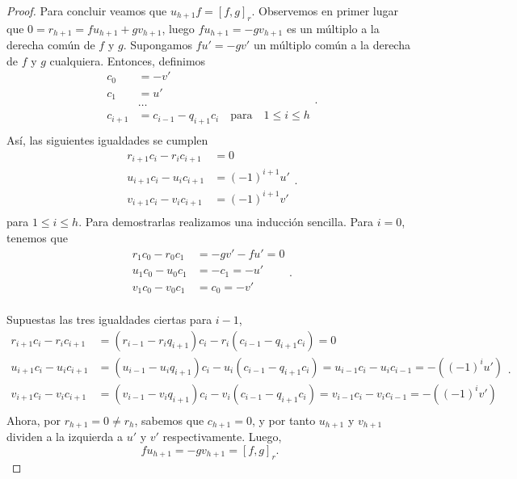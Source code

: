 \begin{proof}
Para concluir veamos que \(u_{h+1}f = [f,g]_r\). Observemos en primer lugar que \(0 = r_{h+1} = fu_{h+1} + gv_{h+1}\), luego \(fu_{h+1} = -gv_{h+1}\) es un múltiplo a la derecha común de \(f\) y \(g\). Supongamos \(fu' = -gv'\) un múltiplo común a la derecha de \(f\) y \(g\) cualquiera. Entonces, definimos
\[
\begin{aligned}
    c_0 &= -v' \\
    c_1 &= u' \\
    &\ldots \\
    c_{i+1} &= c_{i-1} - q_{i+1}c_i\quad \text{para}\quad 1 \le i \le h  \\
\end{aligned}
.\]
Así, las siguientes igualdades se cumplen
\[
\begin{aligned}
    r_{i+1}c_{i} - r_{i}c_{i+1} &= 0 \\
    u_{i+1}c_{i} - u_{i}c_{i+1} &= (-1)^{i+1}u' \\
    v_{i+1}c_{i} - v_{i}c_{i+1} &= (-1)^{i+1}v' \\
\end{aligned}
.\]
para \(1 \le i \le h\). Para demostrarlas realizamos una inducción sencilla. Para \(i = 0\), tenemos que
\[
\begin{aligned}
    r_{1}c_{0} - r_{0}c_{1} &= -gv' - fu' =  0 \\
    u_{1}c_{0} - u_{0}c_{1} &= -c_{1} =  -u' \\
    v_{1}c_{0} - v_{0}c_{1} &= c_{0} = -v' \\
\end{aligned}
.\]

Supuestas las tres igualdades ciertas para \(i-1\),
 \[
\begin{aligned}
    r_{i+1}c_{i} - r_{i}c_{i+1} &= (r_{i-1} - r_{i}q_{i+1})c_i - r_i(c_{i-1} - q_{i+1}c_i) = 0 \\
    u_{i+1}c_{i} - u_{i}c_{i+1} &= (u_{i-1} - u_{i}q_{i+1})c_i - u_i(c_{i-1} - q_{i+1}c_i) = u_{i-1}c_i - u_ic_{i-1}= -((-1)^{i}u')  \\
    v_{i+1}c_{i} - v_{i}c_{i+1} &= (v_{i-1} - v_{i}q_{i+1})c_i - v_i(c_{i-1} - q_{i+1}c_i) = v_{i-1}c_i - v_ic_{i-1}= -((-1)^{i}v')  \\
\end{aligned}
.\]
Ahora, por \(r_{h+1} = 0 \neq r_{h}\), sabemos que \(c_{h+1} = 0\), y por tanto \(u_{h+1}\) y \(v_{h+1}\) dividen a la izquierda a \(u'\) y \(v'\) respectivamente. Luego,
\[
f u_{h+1} = -g v_{h+1} = {[f, g]_r}
.\]
\end{proof}

